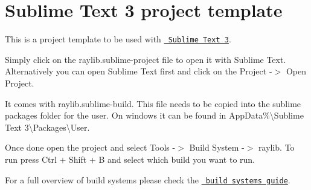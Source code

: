 \chapter{Sublime Text 3 project template}
\hypertarget{md__2home_2giangvu_2CPPprog_2raylib-tetris_2build_2external_2raylib-master_2projects_2SublimeText_2README}{}\label{md__2home_2giangvu_2CPPprog_2raylib-tetris_2build_2external_2raylib-master_2projects_2SublimeText_2README}
\label{md__2home_2giangvu_2CPPprog_2raylib-tetris_2build_2external_2raylib-master_2projects_2SublimeText_2README_autotoc_md86}%
%
 This is a project template to be used with \href{https://www.sublimetext.com/}{\texttt{ Sublime Text 3}}.

Simply click on the {\ttfamily raylib.\+sublime-\/project} file to open it with Sublime Text. Alternatively you can open Sublime Text first and click on the {\ttfamily Project -\/\texorpdfstring{$>$}{>} Open Project}.

It comes with raylib.\+sublime-\/build. This file needs to be copied into the sublime packages folder for the user. On windows it can be found in {\ttfamily App\+Data\%\textbackslash{}Sublime Text 3\textbackslash{}Packages\textbackslash{}User}.

Once done open the project and select {\ttfamily Tools -\/\texorpdfstring{$>$}{>} Build System -\/\texorpdfstring{$>$}{>} raylib}. To run press Ctrl + Shift + B and select which build you want to run.

For a full overview of build systems please check the \href{https://www.sublimetext.com/docs/3/build_systems.html}{\texttt{ build systems guide}}. 